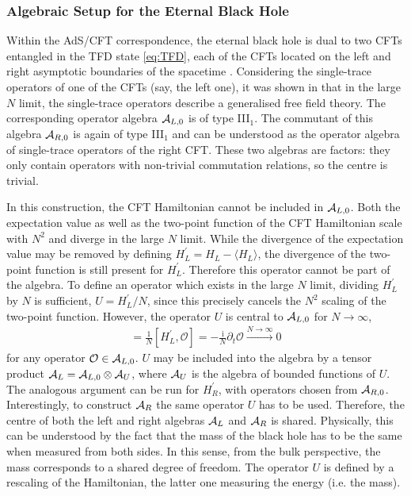 \documentclass[a4paper,11pt]{article}
\renewcommand{\i}{\text{i}}
\newcommand{\1}{\mathds{1}}
\newcommand{\p}{{\prime}}
\begin{document}
\subsubsection{Algebraic Setup for the Eternal Black Hole}
\label{sec:AlgebraicSetupEternalBlackHole}

Within the AdS/CFT correspondence, the eternal black hole is dual to two CFTs entangled in the TFD state \eqref{eq:TFD}, each of the CFTs located on the left and right asymptotic boundaries of the spacetime \cite{Maldacena:2001kr}. Considering the single-trace operators of one of the CFTs (say, the left one), it was shown in \cite{Leutheusser:2021frk,Leutheusser:2021qhd} that in the large $N$ limit, the single-trace operators describe a generalised free field theory. The corresponding operator algebra ${\cal A}_{L,0}$ is of type III$_1$. The commutant of this algebra ${\cal A}_{R,0}$ is again of type III$_1$ and can be understood as the operator algebra of single-trace operators of the right CFT. These two algebras are factors: they only contain operators with non-trivial commutation relations, so the centre is trivial.

In this construction, the CFT Hamiltonian cannot be included in ${\cal A}_{L,0}$. Both the expectation value as well as the two-point function of the CFT Hamiltonian scale with $N^2$ and diverge in the large $N$ limit. While the divergence of the expectation value may be removed by defining $H_L^\p=H_L-\langle H_L\rangle$, the divergence of the two-point function is still present for $H_L^\p$. Therefore this operator cannot be part of the algebra. To define an operator which exists in the large $N$ limit, dividing $H_L^\p$ by $N$ is sufficient, $U=H_L^\p/N$, since this precisely cancels the $N^2$ scaling of the two-point function. However, the operator $U$ is central to ${\cal A}_{L,0}$ for $N\to\infty$,
\begin{align}
    [U,\mathcal{O}]=\frac{1}{N}[H_L^\p,\mathcal{O}]=-\frac{\i}{N}\partial_t\mathcal{O}\overset{N\to\infty}{\to}0\label{eq:CentralOperator}
\end{align}
for any operator $\mathcal{O}\in{\cal A}_{L,0}$. $U$ may be included into the algebra by a tensor product ${\cal A}_L={\cal A}_{L,0}\otimes{\cal A}_U$, where ${\cal A}_U$ is the algebra of bounded functions of $U$. The analogous argument can be run for $H_R^\p$, with operators chosen from ${\cal A}_{R,0}$. Interestingly, to construct ${\cal A}_R$ the same operator $U$ has to be used. Therefore, the centre of both the left and right algebras ${\cal A}_L$ and ${\cal A}_R$ is shared. Physically, this can be understood by the fact that the mass of the black hole has to be the same when measured from both sides. In this sense, from the bulk perspective, the mass corresponds to a shared degree of freedom. The operator $U$ is defined by a rescaling of the Hamiltonian, the latter one measuring the energy (i.e. the mass).
\end{document}
